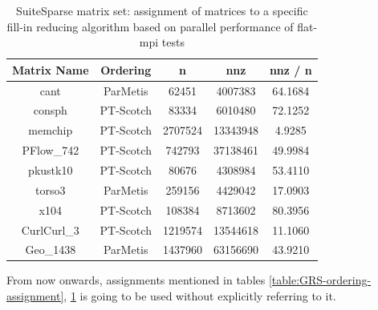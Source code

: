\begin{table}[htpb]
\centering
\begin{tabular}{|c|c|c|c|c|}
\hline
Matrix Name & Ordering  & n       & nnz      & nnz / n \\ \hline
cant        & ParMetis  & 62451   & 4007383  & 64.1684 \\ \hline
consph      & PT-Scotch & 83334   & 6010480  & 72.1252 \\ \hline
memchip     & PT-Scotch & 2707524 & 13343948 & 4.9285  \\ \hline
PFlow\_742  & PT-Scotch & 742793  & 37138461 & 49.9984 \\ \hline
pkustk10    & PT-Scotch & 80676   & 4308984  & 53.4110 \\ \hline
torso3      & ParMetis  & 259156  & 4429042  & 17.0903 \\ \hline
x104        & PT-Scotch & 108384  & 8713602  & 80.3956 \\ \hline
CurlCurl\_3 & PT-Scotch & 1219574 & 13544618 & 11.1060 \\ \hline
Geo\_1438   & ParMetis  & 1437960 & 63156690 & 43.9210 \\ \hline
\end{tabular}
\caption{SuiteSparse matrix set: assignment of matrices to a specific fill-in reducing algorithm based on parallel performance of flat-\gls{mpi} tests}
\label{table:SuiteSparse-ordering-assignment}
\end{table}


From now onwards, assignments mentioned in tables \ref{table:GRS-ordering-assignment}, \ref{table:SuiteSparse-ordering-assignment} is going to be used without explicitly referring to it.\\

